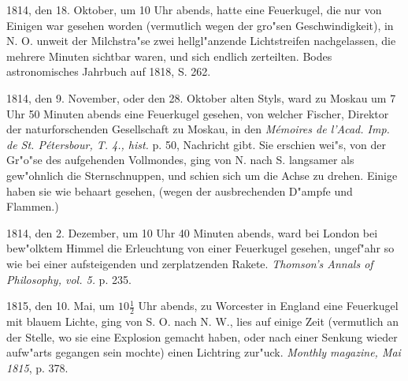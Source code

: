 \documentclass[a4paper, 11pt, oneside, polutonikogreek, german]{article}
\begin{document}
1814, den 18. Oktober, um 10 Uhr abends, hatte eine Feuerkugel, die nur von Einigen war gesehen worden (vermutlich wegen der gro"sen Geschwindigkeit), in N. O. unweit der Milchstra"se zwei hellgl"anzende Lichtstreifen nachgelassen, die mehrere Minuten sichtbar waren, und sich endlich zerteilten. Bodes astronomisches Jahrbuch auf 1818, S. 262.

1814, den 9. November, oder den 28. Oktober alten Styls, ward zu Moskau um 7 Uhr 50 Minuten abends eine Feuerkugel gesehen, von welcher Fischer, Direktor der naturforschenden Gesellschaft zu Moskau, in den \emph{Mémoires de l'Acad. Imp. de St. Pétersbour, T. 4., hist.} p. 50, Nachricht gibt. Sie erschien wei"s, von der Gr"o"se des aufgehenden Vollmondes, ging von N. nach S. langsamer als gew"ohnlich die Sternschnuppen, und schien sich um die Achse zu drehen. Einige haben sie wie behaart gesehen, (wegen der ausbrechenden D"ampfe und Flammen.)

1814, den 2. Dezember, um 10 Uhr 40 Minuten abends, ward bei London bei bew"olktem Himmel die Erleuchtung von einer Feuerkugel gesehen, ungef"ahr so wie bei einer aufsteigenden und zerplatzenden Rakete. \emph{Thomson's Annals of Philosophy, vol. 5.} p. 235.

1815, den 10. Mai, um $\mathfrak{10\frac{1}{2}}$ Uhr abends, zu Worcester in England eine Feuerkugel mit blauem Lichte, ging von S. O. nach N. W., lies auf einige Zeit (vermutlich an der Stelle, wo sie eine Explosion gemacht haben, oder nach einer Senkung wieder aufw"arts gegangen sein mochte) einen Lichtring zur"uck. \emph{Monthly magazine, Mai 1815}, p. 378.
\end{document}
